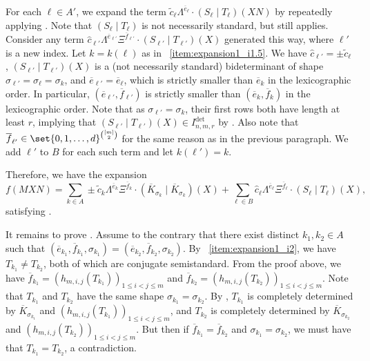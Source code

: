 \documentclass[10pt,a4paper]{amsart}
\begin{document}
\begin{pf}
For each $\ell\in A'$, we expand the term $\widetilde{c}_{\ell} \Lambda^{\overline{e}_\ell}\cdot (S_\ell\mid T_\ell)(XN)$ by repeatedly applying .
Note that $(S_\ell\mid T_\ell)$ is not necessarily standard, but  still applies.
Consider any term $\widehat{c}_{\ell'}\Lambda^{\overline{e}_{\ell'}}\Xi^{\overline{f}_{\ell'}}\cdot (S_{\ell'}\mid T_{\ell'})(X)$ generated this way, where $\ell'$ is a new index.
Let $k=k(\ell)$ as in ~\eqref{item:expansion1_i1.5}.
We have $\widehat{c}_{\ell'}=\pm\widetilde{c}_{\ell}$, $(S_{\ell'}\mid T_{\ell'})(X)$ is a (not necessarily standard) bideterminant of shape $\sigma_{\ell'}=\sigma_\ell=\sigma_k$, and $\overline{e}_{\ell'}=\overline{e}_\ell$, which is strictly smaller than $\overline{e}_k$ in the lexicographic order.
In particular, $(\overline{e}_{\ell'}, \overline{f}_{\ell'})$ is strictly smaller than $(\overline{e}_k, \overline{f}_k)$ in the lexicographic order.
Note that as $\sigma_{\ell'}=\sigma_k$, their first rows both have length at least $r$, implying that $(S_{\ell'}\mid T_{\ell'})(X)\in I^{\det}_{n,m,r}$ by .
Also note that $\overline{f}_{\ell'} \in \set{0,1,\dots,d}^{\binom{[m]}{2}}$ for the same reason as in the previous paragraph.
We add $\ell'$ to $B$ for each such term and let $k(\ell')=k$.

Therefore, we have the expansion
\[
    f(MXN) = \sum_{k \in A} \pm\widetilde{c}_{k} \Lambda^{\overline{e}_k}\Xi^{\overline{f}_k}\cdot (\overline{K}_{\sigma_k}\mid \overline{K}_{\sigma_k})(X) + \sum_{\ell \in B} \widehat{c}_{\ell} \Lambda^{\overline{e}_\ell}\Xi^{\overline{f}_\ell}\cdot (S_\ell\mid T_\ell)(X),
\]
satisfying .

It remains to prove .
Assume to the contrary that there exist distinct $k_1,k_2\in A$ such that $(\overline{e}_{k_1},\overline{f}_{k_1},\sigma_{k_1})=(\overline{e}_{k_2},\overline{f}_{k_2},\sigma_{k_2})$.
By ~\eqref{item:expansion1_i2}, we have $T_{k_1}\neq T_{k_2}$, both of which are conjugate semistandard.
From the proof above, we have $\overline{f}_{k_1}=(h_{m,i,j}(T_{k_1}))_{1\leq i<j\leq m}$ and $\overline{f}_{k_2}=(h_{m,i,j}(T_{k_2}))_{1\leq i<j\leq m}$.
Note that $T_{k_1}$ and $T_{k_2}$ have the same shape $\sigma_{k_1}=\sigma_{k_2}$.
By , $T_{k_1}$ is completely determined by $\overline{K}_{\sigma_{k_1}}$ and $(h_{m,i,j}(T_{k_1}))_{1\leq i<j\leq m}$, and $T_{k_2}$ is completely determined by $\overline{K}_{\sigma_{k_2}}$ and $(h_{m,i,j}(T_{k_2}))_{1\leq i<j\leq m}$.
But then if $\overline{f}_{k_1} = \overline{f}_{k_2}$ and $\sigma_{k_1} = \sigma_{k_2}$, we must have that $T_{k_1} = T_{k_2}$, a contradiction.
\end{pf}
\end{document}
